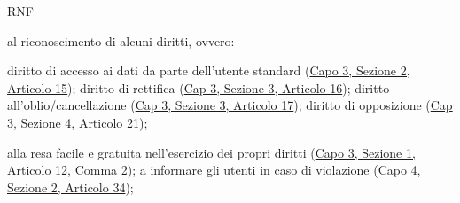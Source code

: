 \begin{listaPersonale}{RNF}
\begin{listaPersonale2}[RNF]{}
             al riconoscimento di alcuni diritti, ovvero:
            \begin{listaPersonale3}[RNF]{}
                   diritto di accesso ai dati da parte dell'utente standard (\href{https://eur-lex.europa.eu/legal-content/IT/TXT/?uri=uriserv:OJ.L_.2016.119.01.0001.01.ITA&toc=OJ:L:2016:119:TOC#d1e2520-1-1}{Capo 3, Sezione 2, Articolo 15});
                   diritto di rettifica (\href{https://eur-lex.europa.eu/legal-content/IT/TXT/?uri=uriserv:OJ.L_.2016.119.01.0001.01.ITA&toc=OJ:L:2016:119:TOC#d1e2606-1-1}{Cap 3, Sezione 3, Articolo 16});
                   diritto all'oblio/cancellazione (\href{https://eur-lex.europa.eu/legal-content/IT/TXT/?uri=uriserv:OJ.L_.2016.119.01.0001.01.ITA&toc=OJ:L:2016:119:TOC#d1e2613-1-1}{Cap 3, Sezione 3, Articolo 17});
                   diritto di opposizione (\href{https://eur-lex.europa.eu/legal-content/IT/TXT/?uri=uriserv:OJ.L_.2016.119.01.0001.01.ITA&toc=OJ:L:2016:119:TOC#d1e2810-1-1}{Cap 3, Sezione 4, Articolo 21});
            \end{listaPersonale3}

             alla resa facile e gratuita nell'esercizio dei propri diritti (\href{https://eur-lex.europa.eu/legal-content/IT/TXT/?uri=uriserv:OJ.L_.2016.119.01.0001.01.ITA&toc=OJ:L:2016:119:TOC#d1e2189-1-1}{Capo 3, Sezione 1, Articolo 12, Comma 2});
             a informare gli utenti in caso di violazione (\href{https://eur-lex.europa.eu/legal-content/IT/TXT/?uri=uriserv:OJ.L_.2016.119.01.0001.01.ITA&toc=OJ:L:2016:119:TOC#d1e3497-1-1}{Capo 4, Sezione 2, Articolo 34});
      \end{listaPersonale2}



\end{listaPersonale}

